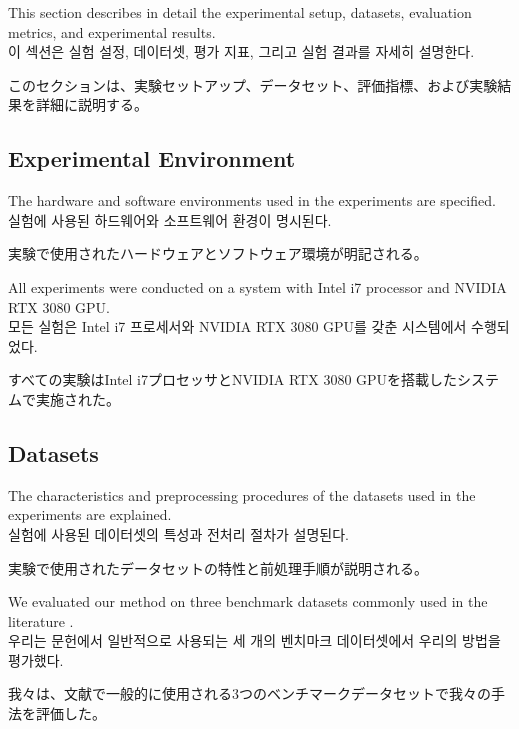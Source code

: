 \documentclass[12pt,a4paper]{article}
\begin{document}
This section describes in detail the experimental setup, datasets, evaluation metrics, and experimental results. \\
이 섹션은 실험 설정, 데이터셋, 평가 지표, 그리고 실험 결과를 자세히 설명한다. \\
\begin{CJK}{UTF8}{min}
このセクションは、実験セットアップ、データセット、評価指標、および実験結果を詳細に説明する。
\end{CJK}

\subsection{Experimental Environment}
The hardware and software environments used in the experiments are specified. \\
실험에 사용된 하드웨어와 소프트웨어 환경이 명시된다. \\
\begin{CJK}{UTF8}{min}
実験で使用されたハードウェアとソフトウェア環境が明記される。
\end{CJK}

All experiments were conducted on a system with Intel i7 processor and NVIDIA RTX 3080 GPU. \\
모든 실험은 Intel i7 프로세서와 NVIDIA RTX 3080 GPU를 갖춘 시스템에서 수행되었다. \\
\begin{CJK}{UTF8}{min}
すべての実験はIntel i7プロセッサとNVIDIA RTX 3080 GPUを搭載したシステムで実施された。
\end{CJK}

\subsection{Datasets}
The characteristics and preprocessing procedures of the datasets used in the experiments are explained. \\
실험에 사용된 데이터셋의 특성과 전처리 절차가 설명된다. \\
\begin{CJK}{UTF8}{min}
実験で使用されたデータセットの特性と前処理手順が説明される。
\end{CJK}

We evaluated our method on three benchmark datasets commonly used in the literature \cite{deng2009imagenet}. \\
우리는 문헌에서 일반적으로 사용되는 세 개의 벤치마크 데이터셋에서 우리의 방법을 평가했다. \\
\begin{CJK}{UTF8}{min}
我々は、文献で一般的に使用される3つのベンチマークデータセットで我々の手法を評価した。
\end{CJK}
\end{document}
